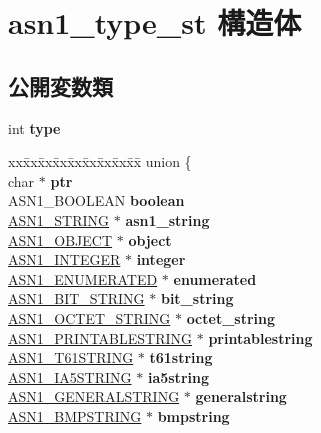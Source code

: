 \hypertarget{structasn1__type__st}{}\section{asn1\+\_\+type\+\_\+st 構造体}
\label{structasn1__type__st}
\subsection*{公開変数類}
\begin{DoxyCompactItemize}
\item 
\hypertarget{structasn1__type__st_af1bd6ef16c406f3cd3fa67eb81693b54}{}int {\bfseries type}\label{structasn1__type__st_af1bd6ef16c406f3cd3fa67eb81693b54}

\item 
\hypertarget{structasn1__type__st_a202a9080533c352b4f0892bf39bdc581}{}\begin{tabbing}
xx\=xx\=xx\=xx\=xx\=xx\=xx\=xx\=xx\=\kill
union \{\\
\>char $\ast$ {\bfseries ptr}\\
\>ASN1\_BOOLEAN {\bfseries boolean}\\
\>\hyperlink{structasn1__string__st}{ASN1\_STRING} $\ast$ {\bfseries asn1\_string}\\
\>\hyperlink{structasn1__object__st}{ASN1\_OBJECT} $\ast$ {\bfseries object}\\
\>\hyperlink{structasn1__string__st}{ASN1\_INTEGER} $\ast$ {\bfseries integer}\\
\>\hyperlink{structasn1__string__st}{ASN1\_ENUMERATED} $\ast$ {\bfseries enumerated}\\
\>\hyperlink{structasn1__string__st}{ASN1\_BIT\_STRING} $\ast$ {\bfseries bit\_string}\\
\>\hyperlink{structasn1__string__st}{ASN1\_OCTET\_STRING} $\ast$ {\bfseries octet\_string}\\
\>\hyperlink{structasn1__string__st}{ASN1\_PRINTABLESTRING} $\ast$ {\bfseries printablestring}\\
\>\hyperlink{structasn1__string__st}{ASN1\_T61STRING} $\ast$ {\bfseries t61string}\\
\>\hyperlink{structasn1__string__st}{ASN1\_IA5STRING} $\ast$ {\bfseries ia5string}\\
\>\hyperlink{structasn1__string__st}{ASN1\_GENERALSTRING} $\ast$ {\bfseries generalstring}\\
\>\hyperlink{structasn1__string__st}{ASN1\_BMPSTRING} $\ast$ {\bfseries bmpstring}\\

\end{tabbing}
\end{DoxyCompactItemize}
